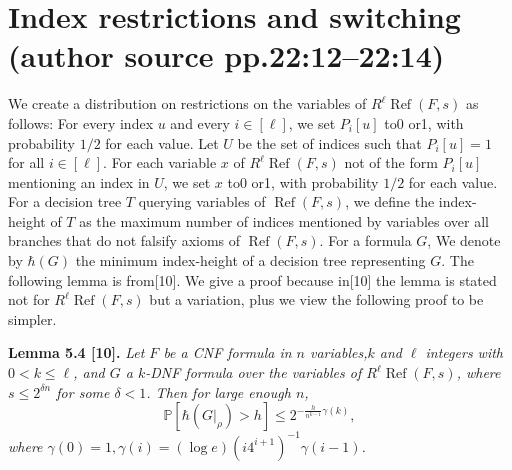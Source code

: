 \documentclass[10pt,a4paper]{article}
\renewcommand{\Ref}{\operatorname{Ref}}
\newenvironment{originalresult}[1]{\par\medskip\noindent\textbf{#1.}\itshape}{\par\medskip}
\begin{document}
\section*{Index restrictions and switching (author source pp.22:12--22:14)}
We create a distribution on restrictions on the variables of $R^\ell\Ref(F,s)$ as follows: For every index $u$ and every $i\in[\ell]$, we set $P_i[u]$ to0 or1, with probability $1/2$ for each value. Let $U$ be the set of indices such that $P_i[u]=1$ for all $i\in[\ell]$. For each variable $x$ of $R^\ell\Ref(F,s)$ not of the form $P_i[u]$ mentioning an index in $U$, we set $x$ to0 or1, with probability $1/2$ for each value.
For a decision tree $T$ querying variables of $\Ref(F,s)$, we define the index-height of $T$ as the maximum number of indices mentioned by variables over all branches that do not falsify axioms of $\Ref(F,s)$. For a formula $G$, We denote by $\hbar(G)$ the minimum index-height of a decision tree representing $G$.
The following lemma is from[10]. We give a proof because in[10] the lemma is stated not for $R^\ell\Ref(F,s)$ but a variation, plus we view the following proof to be simpler.
\begin{originalresult}{Lemma 5.4 [10]}
Let $F$ be a CNF formula in $n$ variables,$k$ and $\ell$ integers with $0<k\le\ell$, and $G$ a $k$-DNF formula over the variables of $R^\ell\Ref(F,s)$, where $s\le2^{\delta n}$ for some $\delta<1$. Then for large enough $n$,
\[\mathbb P[\hbar(G|_\rho)>h]\le2^{-\frac h{n^{k-1}}\gamma(k)},\]
where $\gamma(0)=1,\gamma(i)=(\log e)(i4^{i+1})^{-1}\gamma(i-1)$.
\end{originalresult}
\end{document}
